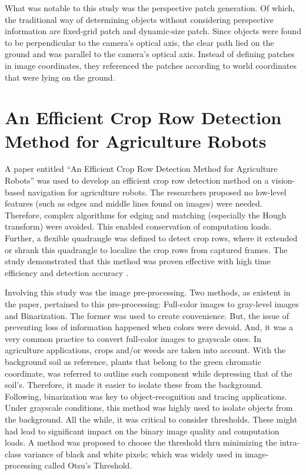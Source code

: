     What was notable to this study was the perspective patch generation. Of which, the traditional way of determining objects without considering perspective information are fixed-grid patch and dynamic-size patch. Since objects were found to be perpendicular to the camera’s optical axis, the clear path lied on the ground and was parallel to the camera’s optical axis. Instead of defining patches in image coordinates, they referenced the patches according to world coordinates that were lying on the ground.

\section{An Efficient Crop Row Detection Method for Agriculture Robots}
   
    A paper entitled “An Efficient Crop Row Detection Method for Agriculture Robots” was used to develop an efficient crop row detection method on a vision-based navigation for agriculture robots. The researchers proposed no low-level features (such as edges and middle lines found on images) were needed. Therefore, complex algorithms for edging and matching (especially the Hough transform) were avoided. This enabled conservation of computation loads. Further, a flexible quadrangle was defined to detect crop rows, where it extended or shrank this quadrangle to localize the crop rows from captured frames. The study demonstrated that this method was proven effective with high time efficiency and detection accuracy \cite{Tu2014}.
 
    Involving this study was the image pre-processing. Two methods, as existent in the paper, pertained to this pre-processing: Full-color images to gray-level images and Binarization. The former was used to create convenience. But, the issue of preventing loss of information happened when colors were devoid. And, it was a very common practice to convert full-color images to grayscale ones. In agriculture applications, crops and/or weeds are taken into account. With the background soil as reference, plants that belong to the green chromatic coordinate, was referred to outline such component while depressing that of the soil’s. Therefore, it made it easier to isolate these from the background. Following, binarization was key to object-recognition and tracing applications. Under grayscale conditions, this method was highly used to isolate objects from the background. All the while, it was critical to consider thresholds. These might had lead to significant impact on the binary image quality and computation loads. A method was proposed to choose the threshold thru minimizing the intra-class variance of black and white pixels; which was widely used in image-processing called Otsu’s Threshold.
 
